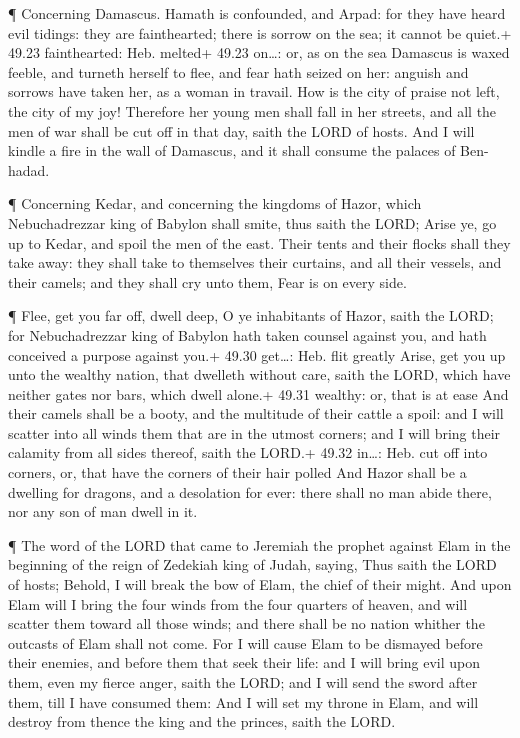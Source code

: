  ¶ Concerning Damascus. Hamath is confounded, and Arpad:
for they have heard evil tidings: they are fainthearted; there is sorrow
on the sea; it cannot be quiet.+ 49.23 fainthearted: Heb. melted+ 49.23
on\ldots: or, as on the sea  Damascus is waxed feeble, and
turneth herself to flee, and fear hath seized on her: anguish and
sorrows have taken her, as a woman in travail.  How is the
city of praise not left, the city of my joy!  Therefore her
young men shall fall in her streets, and all the men of war shall be cut
off in that day, saith the LORD of hosts.  And I will
kindle a fire in the wall of Damascus, and it shall consume the palaces
of Ben-hadad.

 ¶ Concerning Kedar, and concerning the kingdoms of Hazor,
which Nebuchadrezzar king of Babylon shall smite, thus saith the LORD;
Arise ye, go up to Kedar, and spoil the men of the east. 
Their tents and their flocks shall they take away: they shall take to
themselves their curtains, and all their vessels, and their camels; and
they shall cry unto them, Fear is on every side.

 ¶ Flee, get you far off, dwell deep, O ye inhabitants of
Hazor, saith the LORD; for Nebuchadrezzar king of Babylon hath taken
counsel against you, and hath conceived a purpose against you.+ 49.30
get\ldots: Heb. flit greatly  Arise, get you up unto the
wealthy nation, that dwelleth without care, saith the LORD, which have
neither gates nor bars, which dwell alone.+ 49.31 wealthy: or, that is
at ease  And their camels shall be a booty, and the
multitude of their cattle a spoil: and I will scatter into all winds
them that are in the utmost corners; and I will bring their calamity
from all sides thereof, saith the LORD.+ 49.32 in\ldots: Heb. cut off
into corners, or, that have the corners of their hair polled
 And Hazor shall be a dwelling for dragons, and a
desolation for ever: there shall no man abide there, nor any son of man
dwell in it.

 ¶ The word of the LORD that came to Jeremiah the prophet
against Elam in the beginning of the reign of Zedekiah king of Judah,
saying,  Thus saith the LORD of hosts; Behold, I will break
the bow of Elam, the chief of their might.  And upon Elam
will I bring the four winds from the four quarters of heaven, and will
scatter them toward all those winds; and there shall be no nation
whither the outcasts of Elam shall not come.  For I will
cause Elam to be dismayed before their enemies, and before them that
seek their life: and I will bring evil upon them, even my fierce anger,
saith the LORD; and I will send the sword after them, till I have
consumed them:  And I will set my throne in Elam, and will
destroy from thence the king and the princes, saith the LORD.

